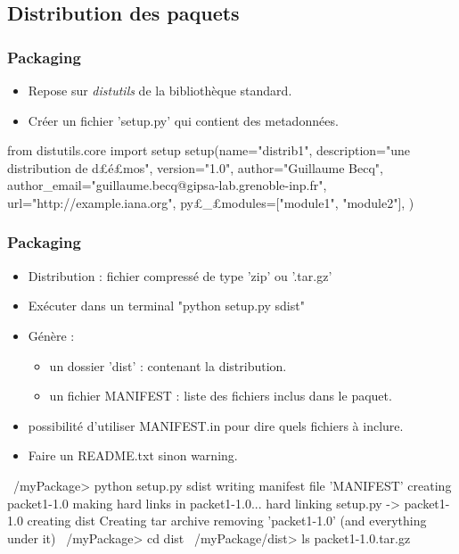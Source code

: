 \subsection{Distribution des paquets}
\begin{frame}[fragile]
\frametitle{Packaging}
\begin{itemize}
 \item Repose sur \emph{distutils} de la bibliothèque standard.
 \item Créer un fichier 'setup.py' qui contient des metadonnées. 
\end{itemize}
\begin{python}
from distutils.core import setup
setup(name="distrib1", 
    description="une distribution de d£{\color{magenta}é}£mos", 
    version="1.0", 
    author="Guillaume Becq", 
    author_email="guillaume.becq@gipsa-lab.grenoble-inp.fr", 
    url="http://example.iana.org",
    py£\_£modules=["module1", "module2"], 
    )
\end{python}
\end{frame}
\begin{frame}[fragile]
\frametitle{Packaging}
\begin{itemize}
 \item Distribution : fichier compressé de type 'zip' ou '.tar.gz' 
 \item Exécuter dans un terminal "python setup.py sdist"
 \item Génère : 
 \begin{itemize}
  \item un dossier 'dist' : contenant la distribution.  
  \item un fichier MANIFEST : liste des fichiers inclus dans le paquet. 
 \end{itemize}
 \item possibilité d'utiliser MANIFEST.in pour dire quels fichiers à inclure.
 \item Faire un README.txt sinon warning.
\end{itemize}
\begin{shell}
~/myPackage> python setup.py sdist
writing manifest file 'MANIFEST'
creating packet1-1.0
making hard links in packet1-1.0...
hard linking setup.py -> packet1-1.0
creating dist
Creating tar archive
removing 'packet1-1.0' (and everything under it)
~/myPackage> cd dist
~/myPackage/dist> ls
packet1-1.0.tar.gz
\end{shell}
\end{frame}
